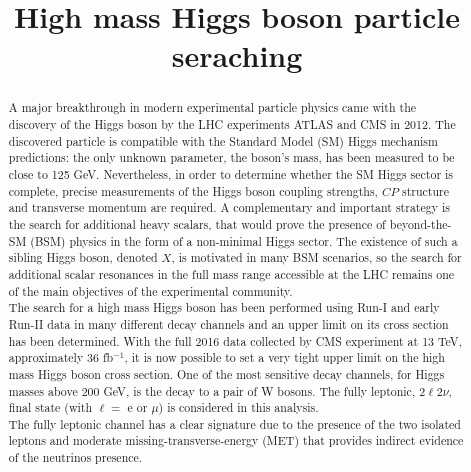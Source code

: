 \documentclass[PhD,binding=0.6cm]{../sapthesis}
\title{High mass Higgs boson particle seraching}
\begin{document}
\newcommand{\aMC}{\textsc{MadGraph}\xspace}
\newcommand{\qqbar}{$q \bar{q}$}
\newcommand{\POWHEG} {{\textsc{powheg}}\xspace}

\frontmatter

\maketitle

\dedication{ dedica a ...}

\begin{abstract}


A major breakthrough in modern experimental particle physics came with the discovery of the Higgs boson by the LHC experiments ATLAS and CMS in 2012.
The discovered particle is compatible with the Standard Model (SM) Higgs mechanism predictions: the only unknown parameter, the boson's mass, has been
measured to be  close to 125 GeV. Nevertheless, in order to determine whether the SM Higgs sector is complete, precise measurements of the Higgs boson coupling strengths, $CP$ structure and transverse momentum are required. 
A complementary and important strategy is the search for additional heavy
scalars, that would prove the presence of  beyond-the-SM (BSM) physics in
the form of a non-minimal Higgs sector. The existence of such a sibling Higgs boson,
denoted $X$, is motivated in many BSM scenarios, so the search for additional scalar resonances in the full
mass range accessible at the LHC remains one of the main objectives of the experimental community.\\
The search for a high mass Higgs boson has been performed using Run-I and
early Run-II data in many different decay channels and an upper limit on its
cross section has been determined. With the full 2016 data collected by CMS
experiment at 13 TeV, approximately  36 fb$^{-1}$, it is now possible to set a very tight upper limit on the high mass Higgs boson cross section.
One of the most sensitive decay channels, for Higgs masses above 200 GeV, is the decay to a pair of W bosons. 
The fully leptonic, 2$\ell$2$\nu$,  final state (with $\ell =$ e or $\mu$) is considered in this analysis.\\ 
The fully leptonic channel has a clear signature due to the presence of the two isolated leptons and moderate missing-transverse-energy (MET) that provides indirect evidence of the neutrinos presence.

\end{abstract}
\end{document}
